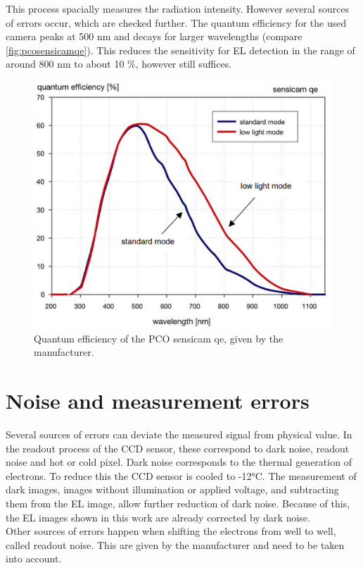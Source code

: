 This process spacially measures the radiation intensity. However several sources of errors occur, which are checked further.
The quantum efficiency for the used camera peaks at 500 nm and decays for larger wavelengths (compare \autoref{fig:pcosensicamqe}). This reduces the sensitivity for EL detection in the range of around 800 nm to about 10 \%, however still suffices.
\begin{figure}
	\centering
	\includegraphics[width=\linewidth]{Images/ExperimentalSetup/PCO_sensicam_QE}
	\caption{Quantum efficiency of the PCO sensicam qe, given by the manufacturer.}
	\label{fig:pcosensicamqe}
\end{figure}

\section{Noise and measurement errors}
Several sources of errors can deviate the measured signal from physical value. In the readout process of the CCD sensor, these correspond to dark noise, readout noise and hot or cold pixel. Dark noise corresponds to the thermal generation of electrons. To reduce this the CCD sensor is cooled to -12°C. The measurement of dark images, images without illumination or applied voltage, and subtracting them from the EL image, allow further reduction of dark noise. Because of this, the EL images shown in this work are already corrected by dark noise.\\

Other sources of errors happen when shifting the electrons from well to well, called readout noise. This are given by the manufacturer and need to be taken into account.
 